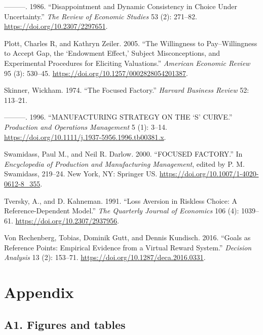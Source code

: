 \documentclass[
  12,
  letterpaper,
  DIV=11,
  numbers=noendperiod]{scrartcl}
\newlength{\cslhangindent}
\newenvironment{CSLReferences}[2] %
 {\begin{list}{}{%
  \setlength{\itemindent}{0pt}
  \setlength{\leftmargin}{0pt}
  \setlength{\parsep}{0pt}
  \ifodd #1
   \setlength{\leftmargin}{\cslhangindent}
   \setlength{\itemindent}{-1\cslhangindent}
  \fi
  \setlength{\itemsep}{#2\baselineskip}}}
 {\end{list}}
\begin{document}
\begin{CSLReferences}{1}{0}
---------. 1986. {``Disappointment and {Dynamic Consistency} in {Choice}
Under {Uncertainty}.''} \emph{The Review of Economic Studies} 53 (2):
271--82. \url{https://doi.org/10.2307/2297651}.

Plott, Charles R, and Kathryn Zeiler. 2005. {``The {Willingness} to
{Pay}--{Willingness} to {Accept Gap}, the {`{Endowment Effect},'}
{Subject Misconceptions}, and {Experimental Procedures} for {Eliciting
Valuations}.''} \emph{American Economic Review} 95 (3): 530--45.
\url{https://doi.org/10.1257/0002828054201387}.

Skinner, Wickham. 1974. {``The Focused Factory.''} \emph{Harvard
Business Review} 52: 113--21.

---------. 1996. {``{MANUFACTURING STRATEGY ON THE} {`{S}'} {CURVE}.''}
\emph{Production and Operations Management} 5 (1): 3--14.
\url{https://doi.org/10.1111/j.1937-5956.1996.tb00381.x}.

Swamidass, Paul M., and Neil R. Darlow. 2000. {``{FOCUSED FACTORY}.''}
In \emph{Encyclopedia of {Production} and {Manufacturing Management}},
edited by P. M. Swamidass, 219--24. New York, NY: Springer US.
\url{https://doi.org/10.1007/1-4020-0612-8_355}.

Tversky, A., and D. Kahneman. 1991. {``Loss {Aversion} in {Riskless
Choice}: {A Reference-Dependent Model}.''} \emph{The Quarterly Journal
of Economics} 106 (4): 1039--61. \url{https://doi.org/10.2307/2937956}.

Von Rechenberg, Tobias, Dominik Gutt, and Dennis Kundisch. 2016.
{``Goals as {Reference Points}: {Empirical Evidence} from a {Virtual
Reward System}.''} \emph{Decision Analysis} 13 (2): 153--71.
\url{https://doi.org/10.1287/deca.2016.0331}.

\end{CSLReferences}

\newpage

\section{Appendix}\label{appendix}

\subsection{A1. Figures and tables}\label{a1.-figures-and-tables}
\end{document}
